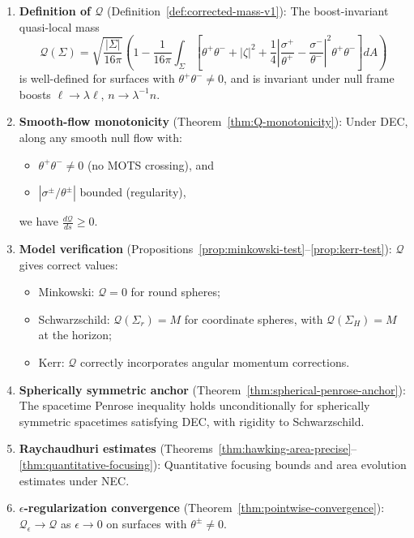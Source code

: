 \begin{enumerate}[label=\textbf{(P\arabic*)}]
\item \textbf{Definition of $\mathcal{Q}$} (Definition~\ref{def:corrected-mass-v1}): The boost-invariant quasi-local mass
\begin{equation}
\mathcal{Q}(\Sigma) = \sqrt{\frac{|\Sigma|}{16\pi}}\left(1 - \frac{1}{16\pi}\int_\Sigma \left[\theta^+\theta^- + |\zeta|^2 + \frac{1}{4}\left|\frac{\sigma^+}{\theta^+} - \frac{\sigma^-}{\theta^-}\right|^2\theta^+\theta^-\right] dA\right)
\end{equation}
is well-defined for surfaces with $\theta^+\theta^- \neq 0$, and is invariant under null frame boosts $\ell \to \lambda\ell$, $n \to \lambda^{-1}n$.

\item \textbf{Smooth-flow monotonicity} (Theorem~\ref{thm:Q-monotonicity}): Under DEC, along any smooth null flow with:
\begin{itemize}
\item $\theta^+\theta^- \neq 0$ (no MOTS crossing), and
\item $|\sigma^\pm/\theta^\pm|$ bounded (regularity),
\end{itemize}
we have $\frac{d\mathcal{Q}}{ds} \geq 0$.

\item \textbf{Model verification} (Propositions~\ref{prop:minkowski-test}--\ref{prop:kerr-test}): $\mathcal{Q}$ gives correct values:
\begin{itemize}
\item Minkowski: $\mathcal{Q} = 0$ for round spheres;
\item Schwarzschild: $\mathcal{Q}(\Sigma_r) = M$ for coordinate spheres, with $\mathcal{Q}(\Sigma_H) = M$ at the horizon;
\item Kerr: $\mathcal{Q}$ correctly incorporates angular momentum corrections.
\end{itemize}

\item \textbf{Spherically symmetric anchor} (Theorem~\ref{thm:spherical-penrose-anchor}): The spacetime Penrose inequality holds unconditionally for spherically symmetric spacetimes satisfying DEC, with rigidity to Schwarzschild.

\item \textbf{Raychaudhuri estimates} (Theorems~\ref{thm:hawking-area-precise}--\ref{thm:quantitative-focusing}): Quantitative focusing bounds and area evolution estimates under NEC.

\item \textbf{$\epsilon$-regularization convergence} (Theorem~\ref{thm:pointwise-convergence}): $\mathcal{Q}_\epsilon \to \mathcal{Q}$ as $\epsilon \to 0$ on surfaces with $\theta^\pm \neq 0$.
\end{enumerate}


